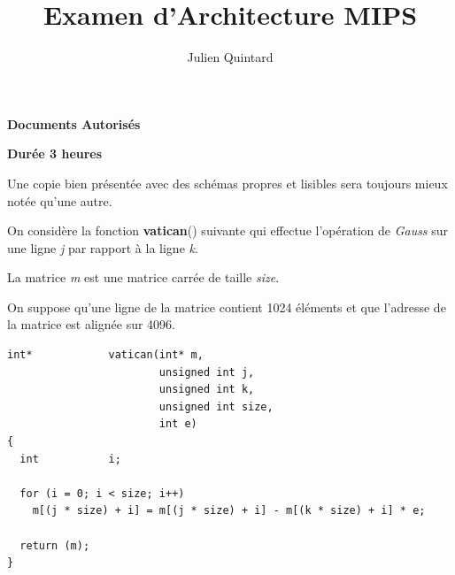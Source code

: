 %
%
%
%
%
%

%
%

\def\path{../../../..}

%
%



%
%


%
%

\title{Examen d'Architecture MIPS}

%
%

\author{\small{Julien Quintard}}

%
%



%
%

\maketitle

%
%

\begin{center}

\textbf{Documents Autoris\'es}

\textbf{Dur\'ee 3 heures}

\scriptsize{Une copie bien pr\'esent\'ee avec des sch\'emas propres et
	    lisibles sera toujours mieux not\'ee qu'une autre.}
\end{center}

%
%

On consid\`ere la fonction \textbf{vatican}() suivante qui effectue
l'op\'eration de \textit{Gauss} sur une ligne \textit{j} par rapport \`a
la ligne \textit{k}.

La matrice \textit{m} est une matrice carr\'ee de taille \textit{size}.

On suppose qu'une ligne de la matrice contient 1024 \'el\'ements
et que l'adresse de la matrice est align\'ee sur 4096.

\begin{verbatim}
int*            vatican(int* m,
                        unsigned int j,
                        unsigned int k,
                        unsigned int size,
                        int e)
{
  int           i;

  for (i = 0; i < size; i++)
    m[(j * size) + i] = m[(j * size) + i] - m[(k * size) + i] * e;

  return (m);
}
\end{verbatim}

